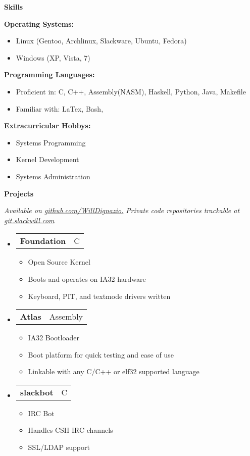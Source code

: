 \documentclass[letterpaper,11pt]{article}
\makeatletter
\newcommand{\resheading}[1]{{\large \colorbox{mygrey}{\begin{minipage}{\textwidth}{\textbf{#1 \vphantom{p\^{E}}}}\end{minipage}}}}
\newcommand{\restwosubheading}[2]{
\begin{tabular*}{6.5in}{l@{\extracolsep{\fill}}r}
		\textbf{#1} & #2 \\
\end{tabular*}\vspace{-6pt}}
\makeatother
\begin{document}
\resheading{{Skills}}
{ \footnotesize
	\begin{description}
		\item{\textbf{Operating Systems:}}
			\begin{itemize}
				\item{Linux (Gentoo, Archlinux, Slackware, Ubuntu, Fedora)}
				\item{Windows (XP, Vista, 7)}
			\end{itemize}
		\item{\textbf{Programming Languages: }}
			\begin{itemize}
				\item{Proficient in: }{C, C++, Assembly(NASM), Haskell, Python, Java, Makefile}
				\item{Familiar with: }{LaTex, Bash, }
			\end{itemize}
		\item{\textbf{Extracurricular Hobbys: }} 
			\begin{itemize}
				\item{Systems Programming}
				\item{Kernel Development} 
				\item{Systems Administration}
			\end{itemize}	
	\end{description}
}
\resheading{Projects}
{ \footnotesize
	\textit{Available on {\href{http://www.github.com/WillDignazio/}{github.com/WillDignazio.}}}
	\textit{Private code repositories trackable at {\href{http://git.slackwill.com/}{git.slackwill.com}}}
	\begin{itemize}
		\item 
		\restwosubheading{Foundation}{C}
			\begin{itemize}
				\item{Open Source Kernel}
				\item{Boots and operates on IA32 hardware}
				\item{Keyboard, PIT, and textmode drivers written}
			\end{itemize}
		\item		
		\restwosubheading{Atlas}{Assembly}
			\begin{itemize}
				\item{IA32 Bootloader} 
				\item{Boot platform for quick testing and ease of use}
				\item{Linkable with any C/C++ or elf32 supported language}
			\end{itemize}
		\item
		\restwosubheading{slackbot}{C}
			\begin{itemize}
				\item{IRC Bot} 
				\item{Handles CSH IRC channels}
				\item{SSL/LDAP support}
			\end{itemize}
	\end{itemize}
}

\end{document}

